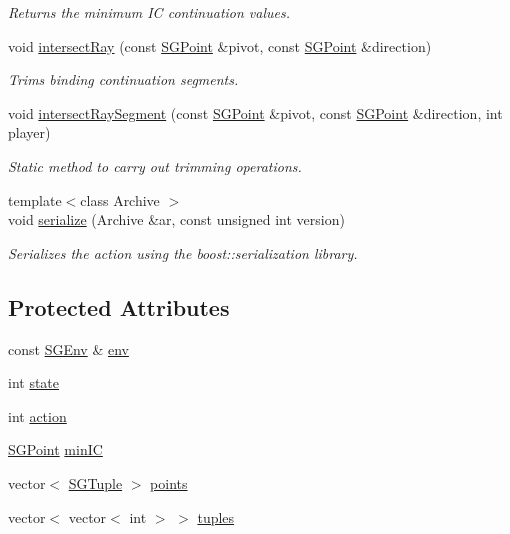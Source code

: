 \begin{DoxyCompactItemize}
\begin{DoxyCompactList}\small\item\em Returns the minimum I\-C continuation values. \end{DoxyCompactList}\item 
void \hyperlink{classSGAction_a7ecafdb0cf42f83931f923f2e4e23f25}{intersect\-Ray} (const \hyperlink{classSGPoint}{S\-G\-Point} \&pivot, const \hyperlink{classSGPoint}{S\-G\-Point} \&direction)
\begin{DoxyCompactList}\small\item\em Trims binding continuation segments. \end{DoxyCompactList}\item 
\hypertarget{classSGAction_ae78f31d121e131788ac4c767e01d012c}{void \hyperlink{classSGAction_ae78f31d121e131788ac4c767e01d012c}{intersect\-Ray\-Segment} (const \hyperlink{classSGPoint}{S\-G\-Point} \&pivot, const \hyperlink{classSGPoint}{S\-G\-Point} \&direction, int player)}\label{classSGAction_ae78f31d121e131788ac4c767e01d012c}

\begin{DoxyCompactList}\small\item\em Static method to carry out trimming operations. \end{DoxyCompactList}\item 
\hypertarget{classSGAction_a2d1b9515be55e396e8595051ba6d3bdd}{{\footnotesize template$<$class Archive $>$ }\\void \hyperlink{classSGAction_a2d1b9515be55e396e8595051ba6d3bdd}{serialize} (Archive \&ar, const unsigned int version)}\label{classSGAction_a2d1b9515be55e396e8595051ba6d3bdd}

\begin{DoxyCompactList}\small\item\em Serializes the action using the boost\-::serialization library. \end{DoxyCompactList}\end{DoxyCompactItemize}
\subsection*{Protected Attributes}
\begin{DoxyCompactItemize}
\item 
const \hyperlink{classSGEnv}{S\-G\-Env} \& \hyperlink{classSGAction_a5ae60f6fd5a545d13c8a2525d7378b9d}{env}
\item 
int \hyperlink{classSGAction_a1ad4ae3feb4e3ec46e21273dd51a6004}{state}
\item 
int \hyperlink{classSGAction_a65c62a3804b50febd9a289f3d8902f85}{action}
\item 
\hyperlink{classSGPoint}{S\-G\-Point} \hyperlink{classSGAction_a20b96be3274e3cd2bc1be0d218fc2b06}{min\-I\-C}
\item 
vector$<$ \hyperlink{classSGTuple}{S\-G\-Tuple} $>$ \hyperlink{classSGAction_a8860ada2cacece1a8feed794d81d9e9f}{points}
\item 
vector$<$ vector$<$ int $>$ $>$ \hyperlink{classSGAction_a60599bc5a745db1557191a61c0db28b3}{tuples}
\end{DoxyCompactItemize}
